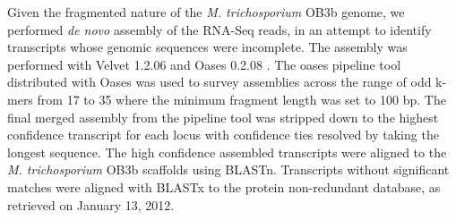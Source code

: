 Given the fragmented nature of the \textit{M. trichosporium} OB3b genome, we performed \textit{de novo} assembly of the RNA-Seq reads, in an attempt to identify transcripts whose genomic sequences were incomplete.
The assembly was performed with Velvet 1.2.06 \cite{zerbino2008} and Oases 0.2.08 \cite{schulz2012}.
The oases pipeline tool distributed with Oases was used to survey assemblies across the range of odd k-mers from 17 to 35 where the minimum fragment length was set to 100 bp.
The final merged assembly from the pipeline tool was stripped down to the highest confidence transcript for each locus with confidence ties resolved by taking the longest sequence.
The high confidence assembled transcripts were aligned to the \textit{M. trichosporium} OB3b scaffolds using BLASTn.
Transcripts without significant matches were aligned with BLASTx to the protein non-redundant database, as retrieved on January 13, 2012.


